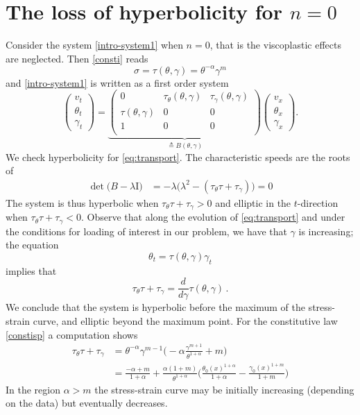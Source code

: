 \documentclass[usletter,11pt]{article}
\theoremstyle{remark}
\begin{document}
\section{The loss of hyperbolicity for $n = 0$} \label{append:hadamard}
Consider the system \eqref{intro-system1} when $n=0$, that is the viscoplastic effects are neglected. Then \eqref{consti} reads
\begin{equation}
\label{constisp}
\sigma = \tau (\theta, \gamma) = \theta^{-\alpha}\gamma^m
\end{equation}
and  \eqref{intro-system1} is written as a first order system
\begin{equation} \label{eq:transport}
 \begin{pmatrix} v_t \\ \theta_t \\ \gamma_t \end{pmatrix} = \underbrace{
 \begin{pmatrix}
 0 & \tau_\theta (\theta, \gamma) & \tau_\gamma (\theta, \gamma) \\
 \tau(\theta, \gamma) & 0 & 0 \\
  1 & 0 & 0 \\
 \end{pmatrix}}_\text{$\triangleq B (\theta, \gamma)$}
  \begin{pmatrix} v_x  \\ \theta_x \\  \gamma_x  \end{pmatrix}.
\end{equation}
We check hyperbolicity for  \eqref{eq:transport}. The characteristic speeds are the roots of
\begin{align*}
 \det\big(B-\lambda \textrm{I}\big) &= -\lambda \big(\lambda^2 - (\tau_\theta \tau + \tau_\gamma )\big)  = 0 
 \end{align*}
 The system is thus hyperbolic when $\tau_\theta \tau + \tau_\gamma > 0$ and elliptic in the $t$-direction when $\tau_\theta \tau + \tau_\gamma < 0$.
 Observe that along the evolution of \eqref{eq:transport} and under the conditions for loading of interest in our problem, we have that
 $\gamma$ is increasing; the equation
 $$
 \theta_t = \tau(\theta, \gamma) \gamma_t 
 $$
 implies that 
 $$
 \tau_\theta \tau + \tau_\gamma = \frac{d}{d\gamma} \tau (\theta, \gamma) \, .
 $$
 We conclude that the system is hyperbolic  before  the maximum of the stress-strain curve,  and elliptic beyond the maximum point. 
 For the constitutive law \eqref{constisp} a computation shows 
 $$
 \begin{aligned}
 \tau_\theta  \tau + \tau_\gamma &= \theta^{-\alpha } \gamma^{m-1} \big ( -\alpha \frac{\gamma^{m+1}}{\theta^{1 + \alpha}} + m \big ) 
 \\
 &= \frac{-\alpha + m}{1 + \alpha} + \frac{\alpha (1+m)}{\theta^{1+\alpha}} 
 \big (  \frac{\theta_0(x)^{1+\alpha}}{1 + \alpha} - \frac{ \gamma_0 (x)^{1+m}}{1+m} \big )
 \end{aligned}
 $$
In the region $\alpha > m$ the stress-strain curve may be initially increasing (depending on the data)
 but eventually decreases.
 
\end{document}
